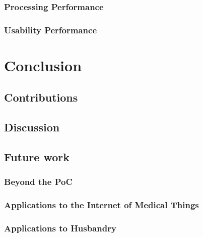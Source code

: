\documentclass[
12pt,        %
openright,   %
twoside,     %
a4paper,     %
brazil,       %
english       %
%
%
]{ppgca}
\begin{document}
\subsection{Processing Performance}
\subsection{Usability Performance}


\chapter{Conclusion}
\section{Contributions}
\section{Discussion}
\section{Future work}
\subsection{Beyond the PoC}
\subsection{Applications to the Internet of Medical Things}
\subsection{Applications to Husbandry}






%
%
\end{document}

